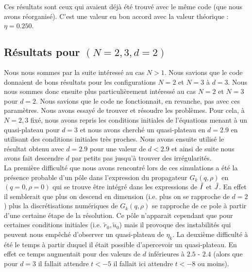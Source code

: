 \documentclass[10.5pt]{article}
\begin{document}
\begin{multicols*}{2}
Ces résultats sont ceux qui avaient déjà été trouvé avec le même code (que nous avons réorganisé). C'est une valeur en bon accord avec la valeur théorique : $\eta = 0.250$.  \\




\subsection{Résultats pour $(N = 2,3, d=2)$}


Nous nous sommes par la suite intéressé au cas $N>1$. Nous savions que le code donnaient de bons résultats pour les configurations $N = 2$ et $N=3$ à $d=3$. Nous nous sommes donc ensuite plus particulièrement intéressé au cas $N = 2$ et $N=3$ pour $d = 2$. Nous savions que le code ne fonctionnait, en revanche, pas avec ces paramètres. Nous avons essayé de trouver et résoudre les problèmes. Pour cela, à $N=2,3$ fixé, nous avons repris les conditions initiales de l'équations menant à un quasi-plateau pour $d=3$ et nous avons cherché un quasi-plateau en $d= 2.9$ en utilisant des conditions initiales très proches. Nous avons ensuite utilisé le résultat obtenu avec $d = 2.9$ pour une valeur de $d < 2.9$ et ainsi de suite nous avons fait descendre $d$ par petits pas jusqu'à trouver des irrégularités. \\

 La première difficulté que nous avons rencontré lors de ces simulations a été la présence probable d'un pôle dans l'expression du propagateur $G_k(q, \rho)$ en $(q = 0, \rho = 0)$ qui se trouve être intégré dans les expressions de $\tilde{I}$ et $\tilde{J}$. En effet il semblerait que plus on descend en dimension (i.e. plus on se rapproche de $d=2$) plus la discrétisations numériques de $G_k(q, \rho)$ se rapproche de ce pole à partir d'une certaine étape de la résolution. Ce pôle n'apparait cependant que pour certaines conditions initiales (i.e. $\tilde{r}_0, \tilde{u}_0$) mais il provoque des instabilités qui peuvent nous empêché d'observer un quasi-plateau de $\eta_k$. La deuxième difficulté à été le temps à partir duquel il était possible d'apercevoir un quasi-plateau. En effet ce temps augmentait pour des valeurs de $d$ inférieures à $2.5$ - $2.4$ (alors que pour $d=3$ il fallait attendre $t<-5$ il fallait ici attendre $t<-8$ ou moins). \\
 

\end{multicols*}
\end{document}

